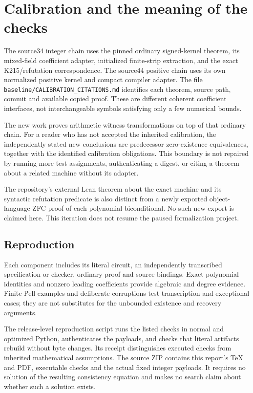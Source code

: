 \section{Calibration and the meaning of the checks}
The source34 integer chain uses the pinned ordinary signed-kernel theorem,
its mixed-field coefficient adapter, initialized finite-strip extraction,
and the exact K215/refutation correspondence. The source44 positive chain
uses its own normalized positive kernel and compact compiler adapter.
The file \texttt{baseline/CALIBRATION\_CITATIONS.md} identifies each theorem,
source path, commit and available copied proof. These are different
coherent coefficient interfaces, not interchangeable symbols satisfying
only a few numerical bounds.

The new work proves arithmetic witness transformations on top of that
ordinary chain. For a reader who has not accepted the inherited calibration,
the independently stated new conclusions are predecessor zero-existence
equivalences, together with the identified calibration obligations. This
boundary is not repaired by running more test assignments, authenticating
a digest, or citing a theorem about a related machine without its adapter.

The repository's external Lean theorem about the exact machine and its
syntactic refutation predicate is also distinct from a newly exported
object-language ZFC proof of each polynomial biconditional. No such new
export is claimed here. This iteration does not resume the paused
formalization project.

\subsection{Reproduction}
Each component includes its literal circuit, an independently transcribed
specification or checker, ordinary proof and source bindings. Exact
polynomial identities and nonzero leading coefficients provide algebraic
and degree evidence. Finite Pell examples and deliberate corruptions test
transcription and exceptional cases; they are not substitutes for the
unbounded existence and recovery arguments.

The release-level reproduction script runs the listed checks in normal
and optimized Python, authenticates the payloads, and checks that literal
artifacts rebuild without byte changes. Its receipt distinguishes executed
checks from inherited mathematical assumptions. The source ZIP contains
this report's TeX and PDF, executable checks and the actual fixed integer
payloads. It requires no solution of the resulting consistency equation
and makes no search claim about whether such a solution exists.

